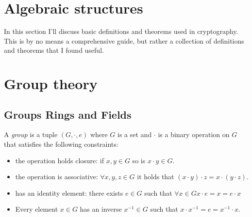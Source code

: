 
\chapter{Algebraic structures}
In this section I'll discuss basic definitions and theorems used in cryptography.
This is by no means a comprehensive guide, 
but rather a collection of definitions and theorems that I found useful.


\chapter{Group theory}

\section{Groups Rings and Fields}
\begin{definition}
    A \emph{group} is a tuple $(G,\cdot,e)$ where $G$ is a set and $\cdot$ is a binary operation on $G$
    that satisfies the following constraints:
    \begin{itemize}
        \item the operation holds closure: if $x,y\in G$ so is $x\cdot y\in G$.
        \item the operation is associative: $\forall x,y,z\in G$ it holds that $(x\cdot y)\cdot z = x\cdot (y\cdot z)$.
        \item has an identity element: there exists $e\in G$ such that $\forall x\in G x\cdot e = x = e\cdot x$
        \item Every element $x\in G$ has an inverse $x^{-1}\in G$ such that $x\cdot x^{-1} = e = x^{-1} \cdot x$.
    \end{itemize}
\end{definition}


